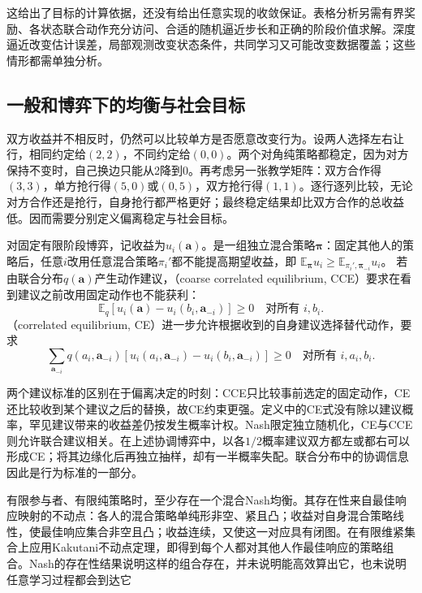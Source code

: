 这给出了目标的计算依据，还没有给出任意实现的收敛保证。表格分析另需有界奖励、各状态联合动作充分访问、合适的随机逼近步长和正确的阶段价值求解。深度逼近改变估计误差，局部观测改变状态条件，共同学习又可能改变数据覆盖；这些情形都需单独分析。

\subsection{一般和博弈下的均衡与社会目标}
\label{sec:rl-multi-agent-equilibria}

双方收益并不相反时，仍然可以比较单方是否愿意改变行为。设两人选择左右让行，相同约定给$(2,2)$，不同约定给$(0,0)$。两个对角纯策略都稳定，因为对方保持不变时，自己换边只能从2降到0。再考虑另一张教学矩阵：双方合作得$(3,3)$，单方抢行得$(5,0)$或$(0,5)$，双方抢行得$(1,1)$。逐行逐列比较，无论对方合作还是抢行，自身抢行都严格更好；最终稳定结果却比双方合作的总收益低。因而需要分别定义偏离稳定与社会目标。

\begin{definition}[有限阶段博弈的偏离标准]
\label{def:rl-multi-agent-equilibria}
对固定有限阶段博弈，记收益为$u_i(\bm a)$。是一组独立混合策略$\bm\pi$：固定其他人的策略后，任意$i$改用任意混合策略$\pi_i'$都不能提高期望收益，即
$\mathbb E_{\bm\pi}u_i\geq\mathbb E_{\pi_i',\bm\pi_{-i}}u_i$。
若由联合分布$q(\bm a)$产生动作建议，（coarse correlated equilibrium, CCE）要求在看到建议之前改用固定动作也不能获利：
\[
 \mathbb E_q[u_i(\bm a)-u_i(b_i,\bm a_{-i})]\geq0
 \quad\text{对所有 }i,b_i.
\]
（correlated equilibrium, CE）进一步允许根据收到的自身建议选择替代动作，要求
\[
 \sum_{\bm a_{-i}}q(a_i,\bm a_{-i})
 [u_i(a_i,\bm a_{-i})-u_i(b_i,\bm a_{-i})]\geq0
 \quad\text{对所有 }i,a_i,b_i.
\]
\end{definition}

两个建议标准的区别在于偏离决定的时刻：CCE只比较事前选定的固定动作，CE还比较收到某个建议之后的替换，故CE约束更强。定义中的CE式没有除以建议概率，罕见建议带来的收益差仍按发生概率计权。Nash限定独立随机化，CE与CCE则允许联合建议相关。在上述协调博弈中，以各$1/2$概率建议双方都左或都右可以形成CE；将其边缘化后再独立抽样，却有一半概率失配。联合分布中的协调信息因此是行为标准的一部分。

有限参与者、有限纯策略时，至少存在一个混合Nash均衡。其存在性来自最佳响应映射的不动点：各人的混合策略单纯形非空、紧且凸；收益对自身混合策略线性，使最佳响应集合非空且凸；收益连续，又使这一对应具有闭图。在有限维紧集合上应用Kakutani不动点定理，即得到每个人都对其他人作最佳响应的策略组合。Nash的存在性结果说明这样的组合存在，并未说明能高效算出它，也未说明任意学习过程都会到达它

